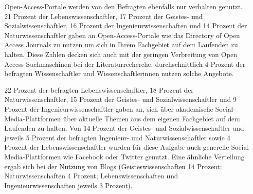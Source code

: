 Open-Access-Portale werden von den Befragten ebenfalls nur verhalten genutzt. 21 Prozent der Lebenswissenschaftler, 17 Prozent der Geistes- und Sozialwissenschaftler, 16 Prozent der Ingenieurwissenschaften und 14 Prozent der Naturwissenschaftler gaben an Open-Access-Portale wie das Directory of Open Access Journals zu nutzen um sich in Ihrem Fachgebiet auf dem Laufenden zu halten. Diese Zahlen decken sich auch mit der geringen Verbreitung von Open Access Suchmaschinen bei der Literaturrecherche, durchschnittlich 4 Prozent der befragten Wissenschaftler und Wissenschaftlerinnen nutzen solche Angebote.

22 Prozent der befragten Lebenswissenschaftler, 18 Prozent der Naturwissenschaftler, 15 Prozent der Geistes- und Sozialwissenschaftler und 9 Prozent der Ingenieurwissenschaftler gaben an, sich über akademische Social-Media-Plattformen über aktuelle Themen aus dem eigenen Fachgebiet auf dem Laufenden zu halten. Von 14 Prozent der Geistes- und Sozialwissenschaftler und jeweils 5 Prozent der befragten Ingenieur- und Naturwissenschaftler sowie 4 Prozent der Lebenswissenschaftler wurden für diese Aufgabe auch generelle Social Media-Plattformen wie Facebook oder Twitter genutzt. Eine ähnliche Verteilung ergab sich bei der Nutzung von Blogs (Geisteswissenschaften 14 Prozent; Naturwissenschaften 4 Prozent; Lebenswissenschaften und Ingenieurwissenschaften jeweils 3 Prozent).


